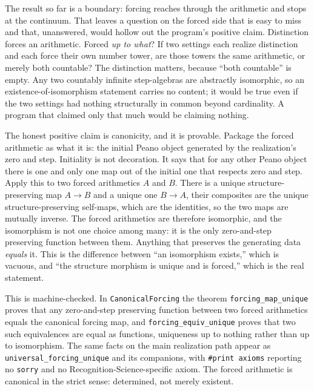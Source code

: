 \documentclass[11pt,a4paper]{article}
\theoremstyle{definition}
\theoremstyle{remark}
\begin{document}
The result so far is a boundary: forcing reaches through the arithmetic and stops
at the continuum. That leaves a question on the forced side that is easy to miss
and that, unanswered, would hollow out the program's positive claim. Distinction
forces an arithmetic. Forced \emph{up to what}? If two settings each realize
distinction and each force their own number tower, are those towers the same
arithmetic, or merely both countable? The distinction matters, because ``both
countable'' is empty. Any two countably infinite step-algebras are abstractly
isomorphic, so an existence-of-isomorphism statement carries no content; it would
be true even if the two settings had nothing structurally in common beyond
cardinality. A program that claimed only that much would be claiming nothing.

The honest positive claim is canonicity, and it is provable. Package the forced
arithmetic as what it is: the initial Peano object generated by the realization's
zero and step. Initiality is not decoration. It says that for any other Peano
object there is one and only one map out of the initial one that respects zero and
step. Apply this to two forced arithmetics $A$ and $B$. There is a unique
structure-preserving map $A\to B$ and a unique one $B\to A$, their composites are
the unique structure-preserving self-maps, which are the identities, so the two
maps are mutually inverse. The forced arithmetics are therefore isomorphic, and
the isomorphism is not one choice among many: it is the only zero-and-step
preserving function between them. Anything that preserves the generating data
\emph{equals} it. This is the difference between ``an isomorphism exists,'' which
is vacuous, and ``the structure morphism is unique and is forced,'' which is the
real statement.

This is machine-checked. In \texttt{CanonicalForcing} the theorem
\texttt{forcing\_map\_unique} proves that any zero-and-step preserving function
between two forced arithmetics equals the canonical forcing map, and
\texttt{forcing\_equiv\_unique} proves that two such equivalences are equal as
functions, uniqueness up to nothing rather than up to isomorphism. The same facts
on the main realization path appear as \texttt{universal\_forcing\_unique} and
its companions, with \verb|#print axioms| reporting no \texttt{sorry} and no
Recognition-Science-specific axiom. The forced arithmetic is canonical in the
strict sense: determined, not merely existent.
\end{document}

